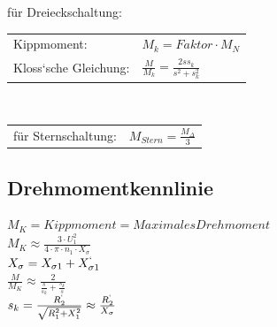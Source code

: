 	für Dreieckschaltung:\\
	\begin{tabular}{p{3cm} p{13cm}}
    	Kippmoment: & $M_k= Faktor \cdot M_N$\\
    	Kloss`sche Gleichung: &$\frac{M}{M_k}=\frac{2 s s_k}{s^2+s_k^2} $\\
    \end{tabular}\\
	\begin{tabular}{p{3cm} p{13cm}}
    	für Sternschaltung: & $M_{Stern}= \frac{M_\Delta}{3}$
    \end{tabular}
	       
	\subsection{Drehmomentkennlinie}
		\begin{minipage}{5cm}
        \end{minipage}
		\begin{minipage}{13cm}
        	$M_K = Kippmoment = Maximales Drehmoment$\\
        	$M_K \approx \frac{3 \cdot U_1^2}{4\cdot \pi \cdot n_1 \cdot
        	X_\sigma}$\\
        	$X_\sigma = X_{\sigma 1} + X_{\sigma 1}^`$\\
        	$\frac{M}{M_K}\approx \frac{2}{\frac{s}{s_k}+\frac{s_k}{s}}$\\
        	$s_k = \frac{R_2^`}{\sqrt{R_1^2 + X_1^2}} \approx
        	\frac{R_2^`}{X_\sigma}$
        	
        \end{minipage}
    	
\newpage
